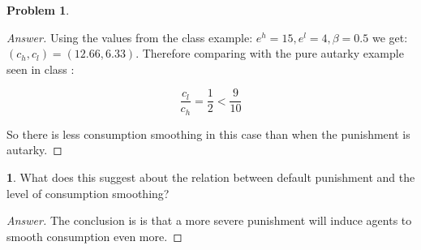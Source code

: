 \documentclass[12pt]{article}
\theoremstyle{definition}
\newtheorem{problem}{Problem}
\newtheorem{subproblem}{}[problem]
\begin{document}
\begin{problem}
\begin{proof}[Answer]
Using the values from the class example: $e^{h}=15, e^{l}=4, \beta=0.5 $  we get: $(c_h,c_l)=(12.66,6.33)$. Therefore comparing with the pure autarky example seen in class :

$$\frac{c_l}{c_h} = \frac{1}{2} < \frac{9}{10}$$

So there is less consumption smoothing in this case than when the punishment is autarky.

\end{proof}

\begin{subproblem}
What does this suggest about the relation between default punishment and the level of consumption smoothing?
\end{subproblem}
\begin{proof}[Answer]

The conclusion is is that a more severe punishment will induce agents to smooth consumption even more.

\end{proof}

\end{problem}




\end{document}
